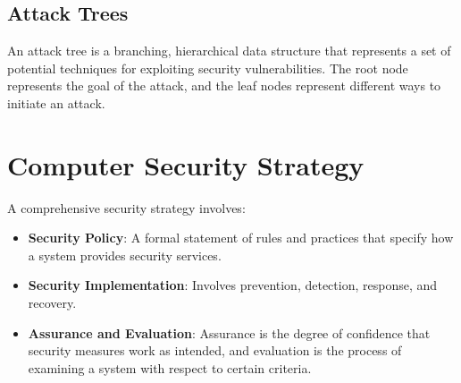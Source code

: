 \documentclass{article}
\begin{document}
\subsection{Attack Trees}
An attack tree is a branching, hierarchical data structure that represents a set of potential techniques for exploiting security vulnerabilities. The root node represents the goal of the attack, and the leaf nodes represent different ways to initiate an attack.

\section{Computer Security Strategy}
A comprehensive security strategy involves:
\begin{itemize}
    \item \textbf{Security Policy}: A formal statement of rules and practices that specify how a system provides security services.
    \item \textbf{Security Implementation}: Involves prevention, detection, response, and recovery.
    \item \textbf{Assurance and Evaluation}: Assurance is the degree of confidence that security measures work as intended, and evaluation is the process of examining a system with respect to certain criteria.
\end{itemize}
\newpage
\end{document}
